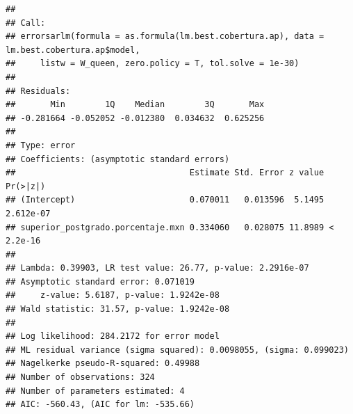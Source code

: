 \documentclass[12pt,]{book}
\newenvironment{Shaded}{\begin{snugshade}}{\end{snugshade}}
\newcommand{\KeywordTok}[1]{\textcolor[rgb]{0.13,0.29,0.53}{\textbf{#1}}}
\newcommand{\DataTypeTok}[1]{\textcolor[rgb]{0.13,0.29,0.53}{#1}}
\newcommand{\FloatTok}[1]{\textcolor[rgb]{0.00,0.00,0.81}{#1}}
\newcommand{\StringTok}[1]{\textcolor[rgb]{0.31,0.60,0.02}{#1}}
\newcommand{\CommentTok}[1]{\textcolor[rgb]{0.56,0.35,0.01}{\textit{#1}}}
\newcommand{\OperatorTok}[1]{\textcolor[rgb]{0.81,0.36,0.00}{\textbf{#1}}}
\newcommand{\NormalTok}[1]{#1}
\begin{document}
\begin{verbatim}
## 
## Call:
## errorsarlm(formula = as.formula(lm.best.cobertura.ap), data = lm.best.cobertura.ap$model, 
##     listw = W_queen, zero.policy = T, tol.solve = 1e-30)
## 
## Residuals:
##       Min        1Q    Median        3Q       Max 
## -0.281664 -0.052052 -0.012380  0.034632  0.625256 
## 
## Type: error 
## Coefficients: (asymptotic standard errors) 
##                                   Estimate Std. Error z value  Pr(>|z|)
## (Intercept)                       0.070011   0.013596  5.1495 2.612e-07
## superior_postgrado.porcentaje.mxn 0.334060   0.028075 11.8989 < 2.2e-16
## 
## Lambda: 0.39903, LR test value: 26.77, p-value: 2.2916e-07
## Asymptotic standard error: 0.071019
##     z-value: 5.6187, p-value: 1.9242e-08
## Wald statistic: 31.57, p-value: 1.9242e-08
## 
## Log likelihood: 284.2172 for error model
## ML residual variance (sigma squared): 0.0098055, (sigma: 0.099023)
## Nagelkerke pseudo-R-squared: 0.49988 
## Number of observations: 324 
## Number of parameters estimated: 4 
## AIC: -560.43, (AIC for lm: -535.66)
\end{verbatim}

\begin{Shaded}
\end{Shaded}
\end{document}
